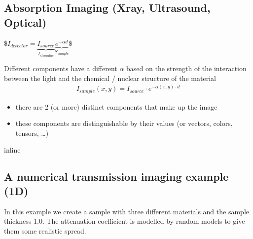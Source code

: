 \documentclass[letterpaper,10pt,english]{sphinxmanual}
\begin{document}
\subsection{Absorption Imaging (X\sphinxhyphen{}ray, Ultrasound, Optical)}
\label{\detokenize{04-BasicSegmentation:absorption-imaging-x-ray-ultrasound-optical}}
\sphinxAtStartPar
{}
\$\(I_{detector}=\underbrace{I_{source}}_{I_{stimulus}}\underbrace{e^{-\alpha d}}_{S_{sample}}\)\$

\sphinxAtStartPar
Different components have a different \(\alpha\) based on the strength of the interaction between the light and the chemical / nuclear structure of the material
\begin{equation*}
\begin{split}I_{sample}(x,y)=I_{source}\cdot{}e^{-\alpha(x,y)\cdot{}d}\end{split}
\end{equation*}


\sphinxAtStartPar
{}
\begin{itemize}
\item {} 
\sphinxAtStartPar
there are 2 (or more) distinct components that make up the image

\item {} 
\sphinxAtStartPar
these components are distinguishable by their values (or vectors, colors, tensors, …)

\end{itemize}

\begin{sphinxVerbatim}[commandchars=\\\{\}]
 inline
   
   
   
\end{sphinxVerbatim}


\subsection{A numerical transmission imaging example (1D)}
\label{\detokenize{04-BasicSegmentation:a-numerical-transmission-imaging-example-1d}}
\sphinxAtStartPar
In this example we create a sample with three different materials and the sample thickness 1.0. The attenuation coefficient is modelled by random models to give them some realistic spread.
\end{document}
